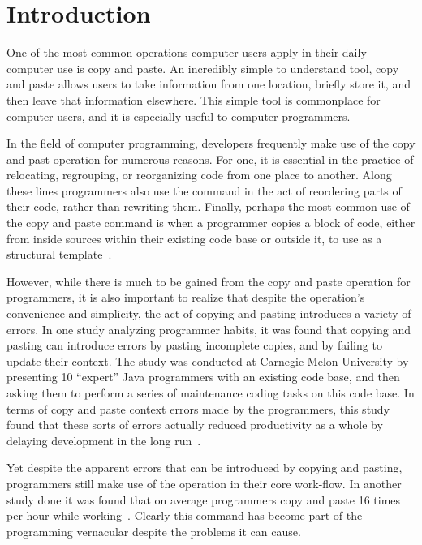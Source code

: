 \documentclass{acm_proc_article-sp}
\begin{document}

\section{Introduction}\label{sec:intro}

One of the most common operations computer users apply in their daily computer use is copy and paste. An incredibly simple to understand tool, copy and paste allows users to take information from one location, briefly store it, and then leave that information elsewhere. This simple tool is commonplace for computer users, and it is especially useful to computer programmers.

In the field of computer programming, developers frequently make use of the copy and past operation for numerous reasons. For one, it is essential in the practice of relocating, regrouping, or reorganizing code from one place to another. Along these lines programmers also use the command in the act of reordering parts of their code, rather than rewriting them. Finally, perhaps the most common use of the copy and paste command is when a programmer copies a block of code, either from inside sources within their existing code base or outside it, to use as a structural template~\cite{ooplCP}.

However, while there is much to be gained from the copy and paste operation for programmers, it is also important to realize that despite the operation's convenience and simplicity, the act of copying and pasting introduces a variety of errors. In one study analyzing programmer habits, it was found that copying and pasting can introduce errors by pasting incomplete copies, and by failing to update their context. The study was conducted at Carnegie Melon University by presenting 10 ``expert'' Java programmers with an existing code base, and then asking them to perform a series of maintenance coding tasks on this code base. In terms of copy and paste context errors made by the programmers, this study found that these sorts of errors actually reduced productivity as a whole by delaying development in the long run~\cite{maintenenceStudy}.

Yet despite the apparent errors that can be introduced by copying and pasting, programmers still make use of the operation in their core work-flow. In another study done it was found that on average programmers copy and paste 16 times per hour while working~\cite{ooplCP}. Clearly this command has become part of the programming vernacular despite the problems it can cause.
\end{document}
